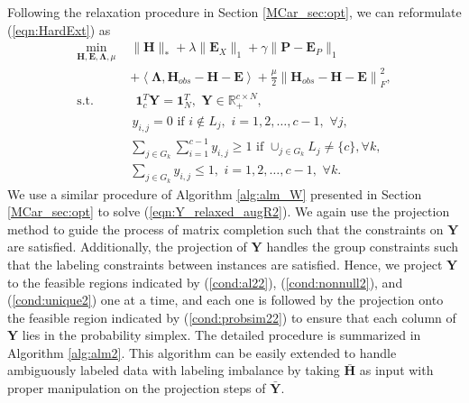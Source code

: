 \documentclass[10pt,journal,compsoc]{IEEEtran}
\begin{document}
Following the relaxation procedure in Section \ref{MCar_sec:opt}, we can reformulate (\ref{eqn:HardExt}) as
\begin{align}
\min_{\mathbf{H},\mathbf{E}, \mathbf{\Lambda}, \mu} \,\,&   \| \mathbf{H} \|_*  + \lambda \|\mathbf{E}_X\|_1  +  \gamma \|\mathbf{P} -\mathbf{E}_P\|_1 \nonumber \\
& + \left \langle  \mathbf{\Lambda} ,
\mathbf{H}_{obs} -\mathbf{H}
-
\mathbf{E}
 \right \rangle  + \frac{\mu}{2} \left\|
\mathbf{H}_{obs} - \mathbf{H}
 -
\mathbf{E}
 \right\|_F^2, \label{eqn:Y_relaxed_augR2} \\
\text{s.t.}
&\,\; \mathbf{1}^T_c \mathbf{Y} = \mathbf{1}^T_N, \,\, \mathbf{Y} \in \mathbb{R}_+^{c \times N}, \label{cond:probsim22}\\
&\, y_{i,j} = 0 \,\, \mathrm{if}  \,\, i \notin L_j, \,\, i = 1, 2,  \dots, c-1, \,\, \forall j, \label{cond:al22}\\
&\sum_{j \in G_k}  \sum_{i=1}^{c-1} y_{i,j}  \geq 1 \,\, \mathrm{if} \,\,  \mathop{\cup}_{j \in G_k} L_j \neq \{c\}, \forall k, \label{cond:nonnull2} \\
& \sum_{j \in G_k} y_{i,j}  \leq 1, \,\, i = 1, 2, \dots, c-1, \,\,  \forall k. \label{cond:unique2}
\end{align}
We use a similar procedure of Algorithm \ref{alg:alm_W} presented in Section \ref{MCar_sec:opt} to solve (\ref{eqn:Y_relaxed_augR2}). We again use the projection method to guide the process of matrix completion such that the constraints on $\mathbf{Y}$ are satisfied. Additionally, the projection of $\mathbf{Y}$ handles the group constraints such that the labeling constraints between instances are satisfied. Hence, we project $\mathbf{Y}$ to the feasible regions indicated by (\ref{cond:al22}), (\ref{cond:nonnull2}), and (\ref{cond:unique2}) one at a time, and each one is followed by the projection onto the feasible region indicated by (\ref{cond:probsim22}) to ensure that each column of $\mathbf{Y}$ lies in the probability simplex.
The detailed procedure is summarized in Algorithm \ref{alg:alm2}. This algorithm can be easily extended to handle ambiguously labeled data with labeling imbalance by taking $\bar{\mathbf{H}}$ as input with proper manipulation on the projection steps of $\bar{\mathbf{Y}}$.%
\end{document}

